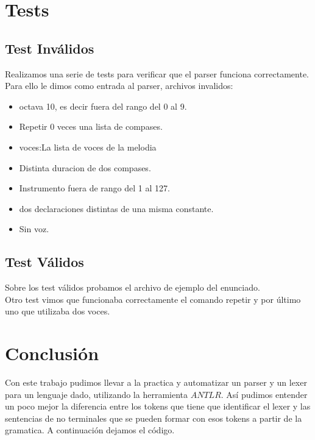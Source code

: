 \documentclass[a4paper]{article}
\begin{document}
\section{Tests}
\subsection{Test Inválidos}

Realizamos una serie de tests para verificar que el parser funciona correctamente. Para ello le dimos como entrada al parser, archivos invalidos:

\begin{itemize}

\item octava 10, es decir fuera del rango del 0 al 9.
\item Repetir 0 veces una lista de compases.
\item voces:La lista de voces de la melodia
\item Distinta duracion de dos compases.
\item Instrumento fuera de rango del 1 al 127.
\item dos declaraciones distintas de una misma constante.
\item Sin voz.

\end{itemize}

\subsection{Test Válidos}

Sobre los test válidos probamos el archivo de ejemplo del enunciado.\\
Otro test vimos que funcionaba correctamente el comando repetir y por último uno que utilizaba dos voces.

\section{Conclusión}
Con este trabajo pudimos llevar a la practica y automatizar un parser y un lexer para un lenguaje dado, utilizando la herramienta $ANTLR$.
Así pudimos entender un poco mejor la diferencia entre los tokens que tiene que identificar el lexer y las sentencias de no terminales que se
pueden formar con esos tokens a partir de la gramatica.
A continuación dejamos el código.


\end{document}
